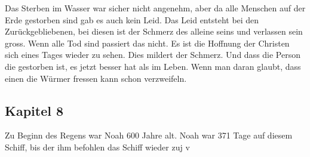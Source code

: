 Das Sterben im Wasser war sicher nicht angenehm, aber da alle Menschen auf der Erde gestorben sind gab es auch kein Leid. Das Leid entsteht bei den Zurückgebliebenen, bei diesen ist der Schmerz des alleine seins und verlassen sein gross. Wenn alle Tod sind passiert das nicht. Es ist die Hoffnung der Christen sich eines Tages wieder zu sehen. Dies mildert der Schmerz. Und dass die Person die gestorben ist, es jetzt besser hat als im Leben. Wenn man daran glaubt, dass einen die Würmer fressen kann schon verzweifeln.
\subsection{Kapitel 8}
Zu Beginn des Regens war Noah 600 Jahre alt. Noah war 371 Tage auf diesem Schiff, bis der \herr ihm befohlen das Schiff wieder zuj v
